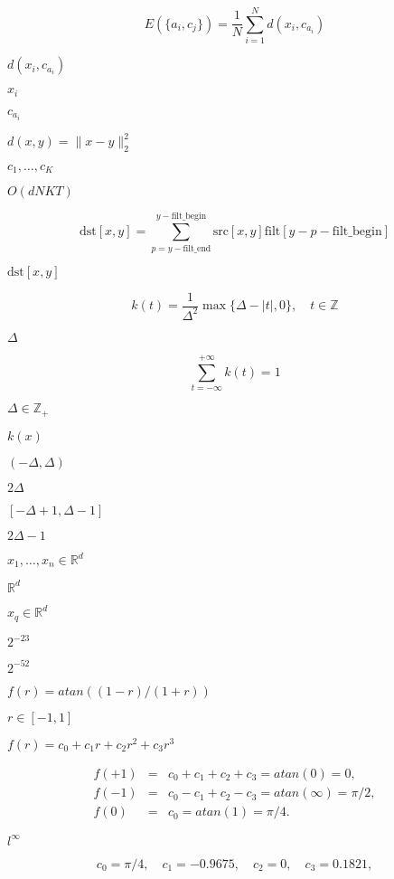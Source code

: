 \documentclass{article}
\begin{document}
\[ E(\{a_{i}, c_j\}) = \frac{1}{N} \sum_{i=1}^N d(x_i, c_{a_i}) \]
\pagebreak

$d(x_i, c_{a_i})$
\pagebreak

$ x_i $
\pagebreak

$ c_{a_i} $
\pagebreak

$d(x,y)=\|x-y\|^2_2$
\pagebreak

$c_1,\dots,c_K$
\pagebreak

$O(dNKT)$
\pagebreak

\[ \mathrm{dst} [x,y] = \sum_{p=y-\mathrm{filt\_end}}^{y-\mathrm{filt\_begin}} \mathrm{src}[x,y] \mathrm{filt}[y - p - \mathrm{filt\_begin}] \]
\pagebreak

$\mathrm{dst}[x,y]$
\pagebreak

\[ k(t) = \frac{1}{\Delta^2} \max\{ \Delta - |t|, 0 \}, \quad t \in \mathbb{Z} \]
\pagebreak

$ \Delta $
\pagebreak

\[ \sum_{t=-\infty}^{+\infty} k(t) = 1 \]
\pagebreak

$ \Delta \in \mathbb{Z}_+ $
\pagebreak

$ k(x) $
\pagebreak

$ (-\Delta,\Delta) $
\pagebreak

$ 2\Delta $
\pagebreak

$ [-\Delta + 1, \Delta-1] $
\pagebreak

$ 2 \Delta - 1 $
\pagebreak

$ x_1,\dots,x_n \in \mathbb{R}^d $
\pagebreak

$ \mathbb{R}^d $
\pagebreak

$ x_q \in \mathbb{R}^d $
\pagebreak

$ 2^{-23} $
\pagebreak

$ 2^{-52} $
\pagebreak

$ f(r)=atan((1-r)/(1+r)) $
\pagebreak

$ r \in [-1,1] $
\pagebreak

$ f(r)=c_0 + c_1 r + c_2 r^2 + c_3 r^3 $
\pagebreak

\begin{eqnarray*} f(+1) &=& c_0 + c_1 + c_2 + c_3 = atan(0) = 0,\\ f(-1) &=& c_0 - c_1 + c_2 - c_3 = atan(\infty) = \pi/2,\\ f(0) &=& c_0 = atan(1) = \pi/4. \end{eqnarray*}
\pagebreak

$ l^{\infty} $
\pagebreak

\[ c_0=\pi/4, \quad c_1=-0.9675, \quad c_2=0, \quad c_3=0.1821, \]
\pagebreak
\end{document}
